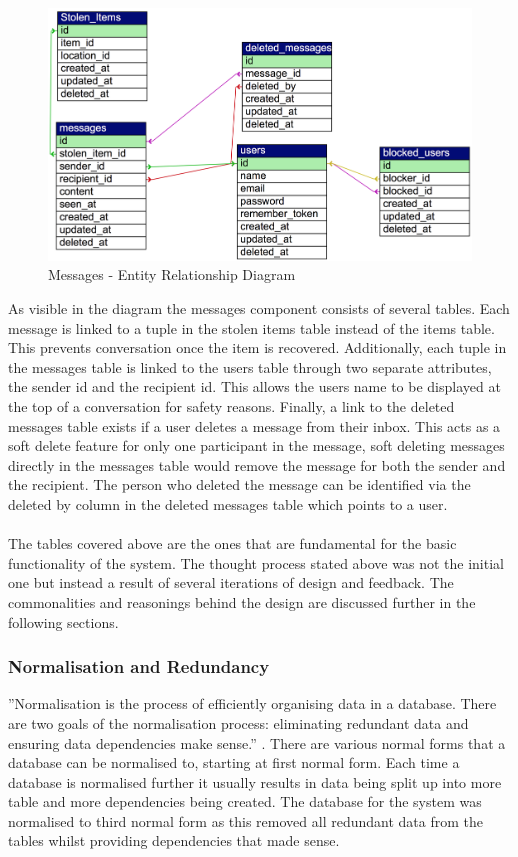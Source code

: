 \begin{figure}[H]
	\centering
	\includegraphics[width=1.0\textwidth]{images/Database/ERD_Messages}
	\caption{Messages - Entity Relationship Diagram} \label{fig:ERD_Messages}
\end{figure}

As visible in the diagram the messages component consists of several tables. Each message is linked to a tuple in the stolen items table instead of the items table. This prevents conversation once the item is recovered. Additionally, each tuple in the messages table is linked to the users table through two separate attributes, the sender id and the recipient id. This allows the users name to be displayed at the top of a conversation for safety reasons. Finally, a link to the deleted messages table exists if a user deletes a message from their inbox. This acts as a soft delete feature for only one participant in the message, soft deleting messages directly in the messages table would remove the message for both the sender and the recipient. The person who deleted the message can be identified via the deleted by column in the deleted messages table which points to a user.\\\\
The tables covered above are the ones that are fundamental for the basic functionality of the system. The thought process stated above was not the initial one but instead a result of several iterations of design and feedback. The commonalities and reasonings behind the design are discussed further in the following sections.

\subsubsection{Normalisation and Redundancy} \label{Section:Database_Normalisation}
''Normalisation is the process of efficiently organising data in a database. There are two goals of the normalisation process: eliminating redundant data and ensuring data dependencies make sense.'' \cite{Databases:NormalisationBasics}. There are various normal forms that a database can be normalised to, starting at first normal form. Each time a database is normalised further it usually results in data being split up into more table and more dependencies being created. The database for the system was normalised to third normal form as this removed all redundant data from the tables whilst providing dependencies that made sense.

